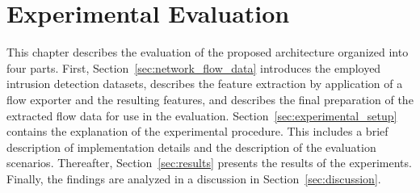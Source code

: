 \documentclass[../../main.tex]{subfiles}
\begin{document}
\chapter{Experimental Evaluation}\label{ch:experimental_evaluation}

This chapter describes the evaluation of the proposed architecture organized into four parts.  First, Section~\ref{sec:network_flow_data} introduces the employed intrusion detection datasets, describes the feature extraction by application of a flow exporter and the resulting features, and describes the final preparation of the extracted flow data for use in the evaluation. Section~\ref{sec:experimental_setup} contains the explanation of the experimental procedure. This includes a brief description of implementation details and the description of the evaluation scenarios. Thereafter, Section~\ref{sec:results} presents the results of the experiments. Finally, the findings are analyzed in a discussion in Section~\ref{sec:discussion}.

\newpage








\end{document}
